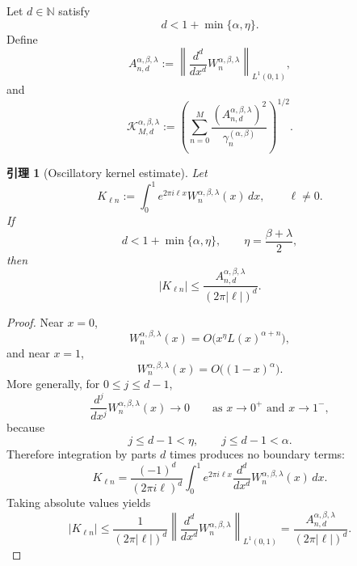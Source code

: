 \documentclass[UTF8]{ctexart}
\newtheorem{lemma}{引理}
\begin{document}
Let $d\in\mathbb N$ satisfy
\[
    d<1+\min\{\alpha,\eta\}.
\]
Define
\[
    A_{n,d}^{\alpha,\beta,\lambda}
    :=
    \left\|
    \frac{d^d}{dx^d}
    W_n^{\alpha,\beta,\lambda}
    \right\|_{L^1(0,1)},
\]
and
\[
    \mathcal K_{M,d}^{\alpha,\beta,\lambda}
    :=
    \left(
    \sum_{n=0}^M
    \frac{
    \left(A_{n,d}^{\alpha,\beta,\lambda}\right)^2
    }{
    \gamma_n^{(\alpha,\beta)}
    }
    \right)^{1/2}.
\]

\begin{lemma}[Oscillatory kernel estimate]
\label{lem:kernel-estimate}
Let
\[
    K_{\ell n}
    :=
    \int_0^1
    e^{2\pi i\ell x}
    W_n^{\alpha,\beta,\lambda}(x)\,dx,
    \qquad
    \ell\ne 0.
\]
If
\[
    d<1+\min\{\alpha,\eta\},
    \qquad
    \eta=\frac{\beta+\lambda}{2},
\]
then
\[
    |K_{\ell n}|
    \le
    \frac{
    A_{n,d}^{\alpha,\beta,\lambda}
    }{
    (2\pi|\ell|)^d
    }.
\]
\end{lemma}

\begin{proof}
Near $x=0$,
\[
    W_n^{\alpha,\beta,\lambda}(x)
    =
    O\bigl(x^\eta L(x)^{\alpha+n}\bigr),
\]
and near $x=1$,
\[
    W_n^{\alpha,\beta,\lambda}(x)
    =
    O\bigl((1-x)^\alpha\bigr).
\]
More generally, for $0\le j\le d-1$,
\[
    \frac{d^j}{dx^j}
    W_n^{\alpha,\beta,\lambda}(x)
    \to 0
    \qquad
    \text{as }x\to 0^+\text{ and }x\to 1^-,
\]
because
\[
    j\le d-1<\eta,
    \qquad
    j\le d-1<\alpha.
\]
Therefore integration by parts $d$ times produces no boundary terms:
\[
    K_{\ell n}
    =
    \frac{(-1)^d}{(2\pi i\ell)^d}
    \int_0^1
    e^{2\pi i\ell x}
    \frac{d^d}{dx^d}
    W_n^{\alpha,\beta,\lambda}(x)\,dx .
\]
Taking absolute values yields
\[
    |K_{\ell n}|
    \le
    \frac{1}{(2\pi|\ell|)^d}
    \left\|
    \frac{d^d}{dx^d}
    W_n^{\alpha,\beta,\lambda}
    \right\|_{L^1(0,1)}
    =
    \frac{
    A_{n,d}^{\alpha,\beta,\lambda}
    }{
    (2\pi|\ell|)^d
    }.
\]
\end{proof}
\end{document}
